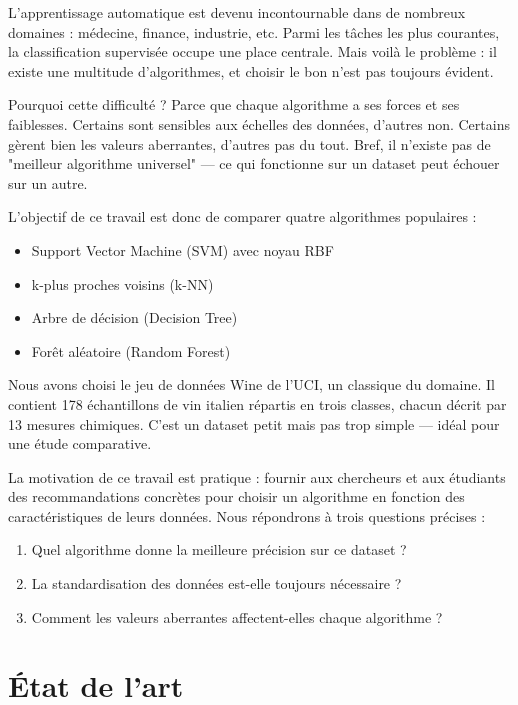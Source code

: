 \documentclass[conference]{IEEEtran}
\begin{document}
L'apprentissage automatique est devenu incontournable dans de nombreux domaines : médecine, finance, industrie, etc. Parmi les tâches les plus courantes, la classification supervisée occupe une place centrale. Mais voilà le problème : il existe une multitude d'algorithmes, et choisir le bon n'est pas toujours évident.

Pourquoi cette difficulté ? Parce que chaque algorithme a ses forces et ses faiblesses. Certains sont sensibles aux échelles des données, d'autres non. Certains gèrent bien les valeurs aberrantes, d'autres pas du tout. Bref, il n'existe pas de "meilleur algorithme universel" — ce qui fonctionne sur un dataset peut échouer sur un autre.

L'objectif de ce travail est donc de comparer quatre algorithmes populaires :
\begin{itemize}
    \item Support Vector Machine (SVM) avec noyau RBF
    \item k-plus proches voisins (k-NN)
    \item Arbre de décision (Decision Tree)
    \item Forêt aléatoire (Random Forest)
\end{itemize}

Nous avons choisi le jeu de données Wine de l'UCI, un classique du domaine. Il contient 178 échantillons de vin italien répartis en trois classes, chacun décrit par 13 mesures chimiques. C'est un dataset petit mais pas trop simple — idéal pour une étude comparative.

La motivation de ce travail est pratique : fournir aux chercheurs et aux étudiants des recommandations concrètes pour choisir un algorithme en fonction des caractéristiques de leurs données. Nous répondrons à trois questions précises :
\begin{enumerate}
    \item Quel algorithme donne la meilleure précision sur ce dataset ?
    \item La standardisation des données est-elle toujours nécessaire ?
    \item Comment les valeurs aberrantes affectent-elles chaque algorithme ?
\end{enumerate}


\section{État de l'art}
\end{document}
